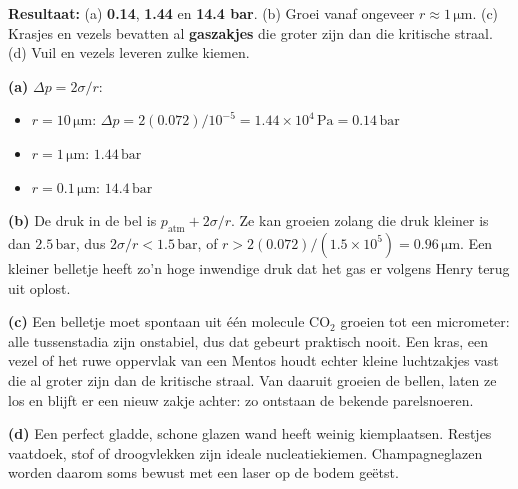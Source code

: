 \begin{oplossing}
\textbf{Resultaat:} (a) \textbf{0.14}, \textbf{1.44} en \textbf{14.4 bar}. (b) Groei vanaf ongeveer \textbf{\(r \approx 1\,\mathrm{\mu m}\)}. (c) Krasjes en vezels bevatten al \textbf{gaszakjes} die groter zijn dan die kritische straal. (d) Vuil en vezels leveren zulke kiemen.

\textbf{(a)} \(\Delta p = 2\sigma/r\):

\begin{itemize}
\item
  \(r = 10\,\mathrm{\mu m}\): \(\Delta p = 2(0.072)/10^{-5} = 1.44\times10^{4}\,\mathrm{Pa} = 0.14\,\mathrm{bar}\)
\item
  \(r = 1\,\mathrm{\mu m}\): \(1.44\,\mathrm{bar}\)
\item
  \(r = 0.1\,\mathrm{\mu m}\): \(14.4\,\mathrm{bar}\)
\end{itemize}

\textbf{(b)} De druk in de bel is \(p_{\text{atm}} + 2\sigma/r\). Ze kan groeien zolang die druk kleiner is dan \(2.5\,\mathrm{bar}\), dus \(2\sigma/r < 1.5\,\mathrm{bar}\), of \(r > 2(0.072)/(1.5\times10^{5}) = 0.96\,\mathrm{\mu m}\). Een kleiner belletje heeft zo'n hoge inwendige druk dat het gas er volgens Henry terug uit oplost.

\textbf{(c)} Een belletje moet spontaan uit één molecule \(\mathrm{CO_2}\) groeien tot een micrometer: alle tussenstadia zijn onstabiel, dus dat gebeurt praktisch nooit. Een kras, een vezel of het ruwe oppervlak van een Mentos houdt echter kleine luchtzakjes vast die al groter zijn dan de kritische straal. Van daaruit groeien de bellen, laten ze los en blijft er een nieuw zakje achter: zo ontstaan de bekende parelsnoeren.

\textbf{(d)} Een perfect gladde, schone glazen wand heeft weinig kiemplaatsen. Restjes vaatdoek, stof of droogvlekken zijn ideale nucleatiekiemen. Champagneglazen worden daarom soms bewust met een laser op de bodem geëtst.
\end{oplossing}

